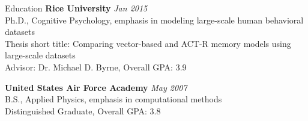  
\begin{rSection}{Education}
  {\bf Rice University} \hfill {\em Jan 2015} \\
  Ph.D., Cognitive Psychology, emphasis in modeling large-scale human behavioral datasets \\
  Thesis short title: Comparing vector-based and ACT-R memory models using large-scale datasets \\
  Advisor: Dr. Michael D. Byrne, Overall GPA: 3.9
\item {\bf United States Air Force Academy} \hfill {\em May 2007} \\ 
  B.S., Applied Physics, emphasis in computational methods \\
  Distinguished Graduate, Overall GPA: 3.8 
\end{rSection}

